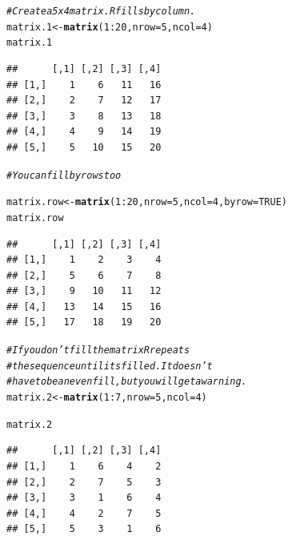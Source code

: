 \documentclass[draft]{article}\usepackage[]{graphicx}\usepackage[]{color}
\makeatletter
\newcommand{\hlnum}[1]{\textcolor[rgb]{0.686,0.059,0.569}{#1}}%
\newcommand{\hlcom}[1]{\textcolor[rgb]{0.678,0.584,0.686}{\textit{#1}}}%
\newcommand{\hlopt}[1]{\textcolor[rgb]{0,0,0}{#1}}%
\newcommand{\hlstd}[1]{\textcolor[rgb]{0.345,0.345,0.345}{#1}}%
\newcommand{\hlkwb}[1]{\textcolor[rgb]{0.69,0.353,0.396}{#1}}%
\newcommand{\hlkwc}[1]{\textcolor[rgb]{0.333,0.667,0.333}{#1}}%
\newcommand{\hlkwd}[1]{\textcolor[rgb]{0.737,0.353,0.396}{\textbf{#1}}}%
\newenvironment{kframe}{%
 \def\at@end@of@kframe{}%
 \ifinner\ifhmode%
  \def\at@end@of@kframe{\end{minipage}}%
  \begin{minipage}{\columnwidth}%
 \fi\fi%
 \def\FrameCommand##1{\hskip\@totalleftmargin \hskip-\fboxsep
 \colorbox{shadecolor}{##1}\hskip-\fboxsep
     \hskip-\linewidth \hskip-\@totalleftmargin \hskip\columnwidth}%
 \MakeFramed {\advance\hsize-\width
   \@totalleftmargin\z@ \linewidth\hsize
   \@setminipage}}%
 {\par\unskip\endMakeFramed%
 \at@end@of@kframe}
\newenvironment{knitrout}{}{} %
\makeatother
\begin{document}
\begin{knitrout}
\color{fgcolor}\begin{kframe}
\begin{alltt}
  \hlcom{# Create a 5 x 4 matrix. R fills by column.}
  \hlstd{matrix.1} \hlkwb{<-} \hlkwd{matrix}\hlstd{(}\hlnum{1}\hlopt{:}\hlnum{20}\hlstd{,} \hlkwc{nrow}\hlstd{=}\hlnum{5}\hlstd{,} \hlkwc{ncol}\hlstd{=}\hlnum{4}\hlstd{)}
  \hlstd{matrix.1}
\end{alltt}
\begin{verbatim}
##      [,1] [,2] [,3] [,4]
## [1,]    1    6   11   16
## [2,]    2    7   12   17
## [3,]    3    8   13   18
## [4,]    4    9   14   19
## [5,]    5   10   15   20
\end{verbatim}
\begin{alltt}
  \hlcom{# You can fill by rows too}

  \hlstd{matrix.row} \hlkwb{<-} \hlkwd{matrix}\hlstd{(}\hlnum{1}\hlopt{:}\hlnum{20}\hlstd{,} \hlkwc{nrow} \hlstd{=} \hlnum{5}\hlstd{,} \hlkwc{ncol}\hlstd{=}\hlnum{4}\hlstd{,} \hlkwc{byrow} \hlstd{=} \hlnum{TRUE}\hlstd{)}
  \hlstd{matrix.row}
\end{alltt}
\begin{verbatim}
##      [,1] [,2] [,3] [,4]
## [1,]    1    2    3    4
## [2,]    5    6    7    8
## [3,]    9   10   11   12
## [4,]   13   14   15   16
## [5,]   17   18   19   20
\end{verbatim}
\begin{alltt}
  \hlcom{# If you don't fill the matrix R repeats}
  \hlcom{# the sequence until its filled. It doesn't}
  \hlcom{# have to be an even fill, but you will get a warning.}
  \hlstd{matrix.2} \hlkwb{<-} \hlkwd{matrix}\hlstd{(}\hlnum{1}\hlopt{:}\hlnum{7}\hlstd{,} \hlkwc{nrow}\hlstd{=}\hlnum{5}\hlstd{,} \hlkwc{ncol}\hlstd{=}\hlnum{4}\hlstd{)}
\end{alltt}


{\ttfamily\noindent\color{warningcolor}{\#\# Warning in matrix(1:7, nrow = 5, ncol = 4): data length [7] is not a sub-multiple or multiple of the number of rows [5]}}\begin{alltt}
  \hlstd{matrix.2}
\end{alltt}
\begin{verbatim}
##      [,1] [,2] [,3] [,4]
## [1,]    1    6    4    2
## [2,]    2    7    5    3
## [3,]    3    1    6    4
## [4,]    4    2    7    5
## [5,]    5    3    1    6
\end{verbatim}
\end{kframe}
\end{knitrout}
    
\end{document}
